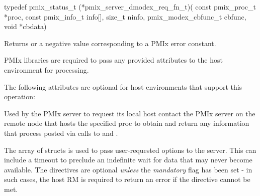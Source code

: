 \format

\cspecificstart
\begin{codepar}
typedef pmix_status_t (*pmix_server_dmodex_req_fn_t)(
                             const pmix_proc_t *proc,
                             const pmix_info_t info[],
                             size_t ninfo,
                             pmix_modex_cbfunc_t cbfunc,
                             void *cbdata)
\end{codepar}
\cspecificend

\begin{arglist}
\end{arglist}

Returns  or a negative value corresponding to a PMIx error constant.

\reqattrstart
\ac{PMIx} libraries are required to pass any provided attributes to the host environment for processing.
\reqattrend

\optattrstart
The following attributes are optional for host environments that support this operation:


\optattrend

\descr

Used by the \ac{PMIx} server to request its local host contact the \ac{PMIx} server on the remote node that hosts the specified proc to obtain and return any information that process posted via calls to  and .

The array of  structs is used to pass user-requested options to the server.
This can include a timeout to preclude an indefinite wait for data that may never become available.
The directives are optional \emph{unless} the \emph{mandatory} flag has been set - in such cases, the host \ac{RM} is required to return an error if the directive cannot be met.


\subsection{}

